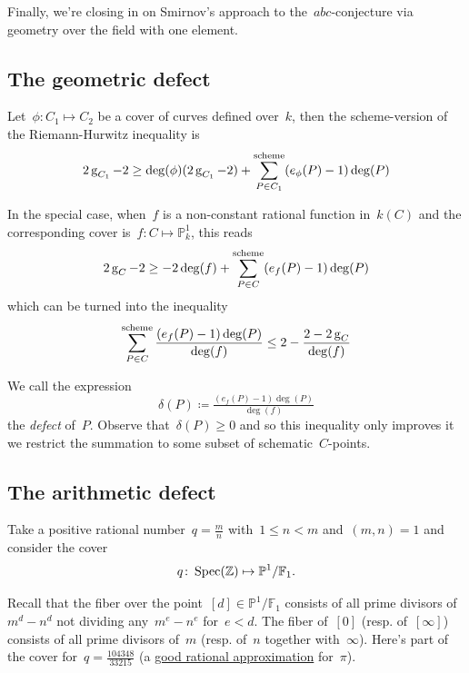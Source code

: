 Finally, we're closing in on Smirnov's approach to the~$abc$-conjecture via geometry over the field with one element.

\subsection{The geometric defect}

Let~$\phi\colon C_1 \mapsto C_2$ be a cover of curves defined over~$k$, then the scheme-version of the Riemann-Hurwitz inequality is
\begin{equation}
  2 \operatorname{g}_{C_1} - 2 \geq \deg(\phi) (2 \operatorname{g}_{C_1} -2) + \sum^{\text{scheme}}_{P \in C_1} (e_{\phi}(P)-1) \deg(P)
\end{equation}

In the special case, when~$f$ is a non-constant rational function in~$k(C)$ and the corresponding cover is~$f\colon C \mapsto \mathbb{P}^1_k$, this reads
\begin{equation}
  2\operatorname{g}_C-2 \geq -2 \deg(f) + \sum^{\text{scheme}}_{P \in C} (e_f(P)-1) \deg(P)
\end{equation}
which can be turned into the inequality
\begin{equation}
  \sum^{\text{scheme}}_{P \in C} \frac{(e_f(P)-1) \deg(P)}{\deg(f)} \leq 2 - \frac{2-2\operatorname{g}_C}{\deg(f)}
\end{equation}

We call the expression
\begin{equation}
  \delta(P) \coloneqq \tfrac{(e_f(P)-1) \deg(P)}{\deg(f)}  
\end{equation}
the \emph{defect} of~$P$. Observe that~$\delta(P) \geq 0$ and so this inequality only improves it we restrict the summation to some subset of schematic~$C$-points.

\subsection{The arithmetic defect}

Take a positive rational number~$q = \frac{m}{n}$ with~$1 \leq n < m$ and~$(m,n)=1$ and consider the cover
\begin{equation}
  q\colon\operatorname{Spec}(\mathbb{Z}) \mapsto \mathbb{P}^1 / \mathbb{F}_1.
\end{equation}

Recall that the fiber over the point~$[d] \in \mathbb{P}^1 / \mathbb{F}_1$ consists of all prime divisors of~$m^d-n^d$ not dividing any~$m^e-n^e$ for~$e < d$. The fiber of~$[0]$ (resp. of~$[\infty]$) consists of all prime divisors of~$m$ (resp. of~$n$ together with~$\infty$). Here's part of the cover for~$q=\frac{104348}{33215}$ (a \href{http://mathworld.wolfram.com/PiApproximations.html}{good rational approximation} for~$\pi$).

